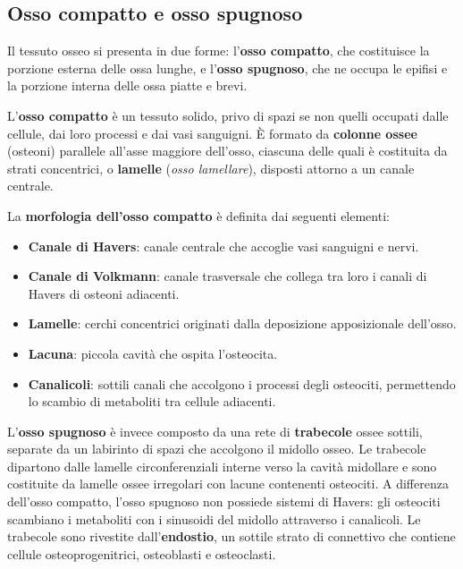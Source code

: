 \subsection{Osso compatto e osso spugnoso}

Il tessuto osseo si presenta in due forme: l'\textbf{osso compatto}, che
costituisce la porzione esterna delle ossa lunghe, e l'\textbf{osso
spugnoso}, che ne occupa le epifisi e la porzione interna delle ossa piatte
e brevi.

L'\textbf{osso compatto} è un tessuto solido, privo di spazi se non quelli
occupati dalle cellule, dai loro processi e dai vasi sanguigni. È formato da
\textbf{colonne ossee} (osteoni) parallele all'asse maggiore dell'osso,
ciascuna delle quali è costituita da strati concentrici, o \textbf{lamelle}
(\textit{osso lamellare}), disposti attorno a un canale centrale.

La \textbf{morfologia dell'osso compatto} è definita dai seguenti elementi:

\begin{itemize}
  \item \textbf{Canale di Havers}: canale centrale che accoglie vasi
    sanguigni e nervi.
  \item \textbf{Canale di Volkmann}: canale trasversale che collega tra loro
    i canali di Havers di osteoni adiacenti.
  \item \textbf{Lamelle}: cerchi concentrici originati dalla deposizione
    apposizionale dell'osso.
  \item \textbf{Lacuna}: piccola cavità che ospita l'osteocita.
  \item \textbf{Canalicoli}: sottili canali che accolgono i processi degli
    osteociti, permettendo lo scambio di metaboliti tra cellule adiacenti.
\end{itemize}

L'\textbf{osso spugnoso} è invece composto da una rete di \textbf{trabecole}
ossee sottili, separate da un labirinto di spazi che accolgono il midollo
osseo. Le trabecole dipartono dalle lamelle
circonferenziali interne verso la cavità midollare e sono costituite da
lamelle ossee irregolari con lacune contenenti osteociti. A differenza
dell'osso compatto, l'osso spugnoso non possiede sistemi di Havers: gli
osteociti scambiano i metaboliti con i sinusoidi del midollo attraverso i
canalicoli. Le trabecole sono rivestite dall'\textbf{endostio}, un sottile
strato di connettivo che contiene cellule osteoprogenitrici, osteoblasti e
osteoclasti.

